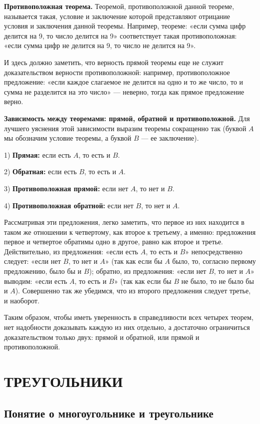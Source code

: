 \documentclass[oneside]{book}
\begin{document}
\textbf{Противоположная теорема.}
Теоремой, противоположной данной теореме, называется такая, условие и заключение которой представляют отрицание условия и заключения данной теоремы.
Например, теореме:
«если сумма цифр делится на 9, то число делится на 9» соответствует такая противоположная:
«если сумма цифр не делится на 9, то число не делится на 9».

И здесь должно заметить, что верность прямой теоремы еще не служит доказательством верности противоположной:
например, противоположное предложение:
«если каждое слагаемое не делится на одно и то же число, то и сумма не разделится на это число» — неверно, тогда как прямое предложение верно.

\textbf{Зависимость между теоремами: прямой, обратной и противоположной.}
Для лучшего уяснения этой зависимости выразим теоремы сокращенно так (буквой $A$ мы обозначим условие теоремы, а буквой $B$ — ее заключение).

1) \textbf{Прямая:}
если есть $A$, то есть и $B$.

2) \textbf{Обратная:}
если есть $B$, то есть и $A$.

3) \textbf{Противоположная прямой:}
если нет $A$, то нет и $B$.

4) \textbf{Противоположная обратной:}
если нет $B$, то нет и $A$.

Рассматривая эти предложения, легко заметить, что первое из них находится в таком же отношении к четвертому, как второе к третьему, а именно:
предложения первое и четвертое обратимы одно в другое, равно как второе и третье.
Действительно, из предложения:
«если есть $A$, то есть и $B$» непосредственно следует:
«если нет $B$, то нет и $A$» (так как если бы $A$ было, то, согласно первому предложению, было бы и $B$);
обратно, из предложения:
«если нет $B$, то нет и $A$» выводим:
«если есть $A$, то есть и $B$» (так как если бы $B$ не было, то не было бы и $A$).
Совершенно так же убедимся, что из второго предложения следует третье, и наоборот.

Таким образом, чтобы иметь уверенность в справедливости всех четырех теорем, нет надобности доказывать каждую из них отдельно, а достаточно ограничиться доказательством только двух:
прямой и обратной, или прямой и противоположной.

\section{ТРЕУГОЛЬНИКИ}

\subsection*{Понятие о многоугольнике и треугольнике}
\end{document}
